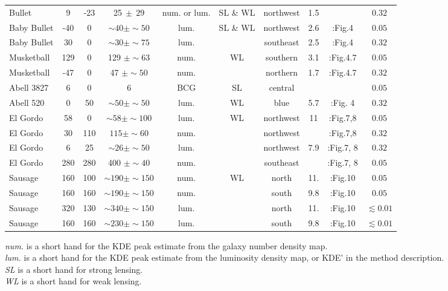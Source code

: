 \documentclass[usenatbib]{mn2e}
\begin{document}
{\begin{table*}
\begin{tabular}{@{}lccccccccc@{}}
	 \hline
	 Bullet  & 9  & -23 & 25$~\pm~29$ & num. or lum. & SL \& WL  & northwest & 1.5 & \citealt{Randall2008d}& $0.32$\\
	 Baby Bullet & -40&  0 & $\sim 40 \pm \sim 50 $  & lum. & SL \& WL & northwest & 2.6 & \citealt{Bradac2008}:Fig.4 & $ 0.05 $\\
	 Baby Bullet & 30  & 0 & $\sim 30 \pm \sim 75 $ & lum. & & southeast  & 2.5 & \citealt{Bradac2008}:Fig.4 & $ 0.32 $\\
	 Musketball &  129 & 0 & 129 $\pm \sim63$ & num. & WL  & southern & 3.1 & \citealt{Dawson2013}:Fig.4.7 & $0.05$\\
	 Musketball & -47 & 0 & 47 $\pm \sim50$ & num. & & 	 northern & 1.7 &  \citealt{Dawson2013}:Fig.4.7& $0.32$ \\
		Abell 3827 & 6 & 0 & 6 & BCG & SL  & central & & \citealt{Williams2011a}& $0.05$\\ 
		Abell 520 & 0 & 50& $\sim50 \pm \sim50$ & lum. & WL  & blue & 5.7 & \citealt{Clowe2012}:Fig. 4 & $0.32$\\
		El Gordo &  58 &0 & $\sim58 \pm \sim100$ & lum. & WL & 	northwest& 11  &\citealt{Jee2014}:Fig.7,8  & $0.05$ \\
		El Gordo & 30 & 110 & $ 115 \pm \sim60$ & num. & & northwest&   &\citealt{Jee2014}:Fig.7,8  & $0.32$ \\
		El Gordo & 6 & 25& $\sim26 \pm \sim50$ & lum. & & northwest & 7.9   &\citealt{Jee2014}:Fig.7, 8  & $0.32$ \\
		El Gordo & 280 & 280 & 400 $\pm \sim40$ & num. &  &southeast &   &\citealt{Jee2014}:Fig.7, 8  & $0.05$\\
		Sausage &160 & 100& $\sim190\pm \sim150$ & num. & WL  & north & 11.  &\citealt{Jee2015}:Fig.10 & $ 0.05$\\ 
		Sausage &160 & 160& $ \sim190\pm \sim150 $  & num. &  & south & 9.8 & \citealt{Jee2015}:Fig.10 & $ 	0.05$ \\ 
		Sausage & 320 & 130 & $\sim340 \pm \sim150 $  & lum. &  & north & 11. & \citealt{Jee2015}:Fig.10 & $\lesssim 0.01$\\ 
		Sausage & 160 & 160 &$\sim230 \pm \sim150 $  & lum. & & south & 9.8 &\citealt{Jee2015}:Fig.10& $\lesssim 0.01$\\ 
	 \hline
	 \end{tabular}

	 \raggedright{
		 {\it num.} is a short hand for the KDE peak estimate from the galaxy number
		 density map. \\
		 {\it lum.} is a short hand for the KDE peak estimate from the luminosity
		 density map, or KDE' in the method description. \\
		 {\it SL} is a short hand for strong lensing. \\
		 {\it WL} is a short hand for weak lensing. \\
	 }
\end{table*}


}
\end{document}
